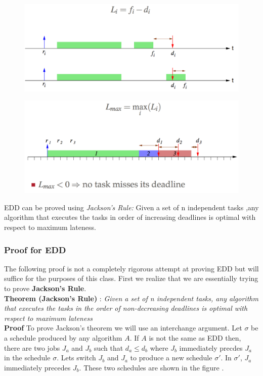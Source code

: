 \documentclass{hw}
\begin{document}
\begin{figure}[H]
  \centering
  \includegraphics[scale=.6]{img/edd}
\end{figure}
\begin{figure}[H]
  \centering
  \includegraphics[scale=.6]{img/edd2}
\end{figure}
EDD can be proved using \emph{Jackson's Rule:} Given a set of n independent tasks
,any algorithm that executes the tasks in order of increasing deadlines is optimal
with respect to maximum lateness.

\subsubsection{Proof for EDD}
The following proof is not a completely rigorous attempt at proving EDD but
will suffice for the purposes of this class. First we realize that we are
essentially trying to prove \textbf{Jackson's Rule}. \\

\textbf{Theorem (Jackson's Rule)} : \textit{Given a set of n independent tasks,
any algorithm that executes the tasks in the order of non-decreasing deadlines
is optimal with respect to maximum lateness} \\

\textbf{Proof} To prove Jackson's theorem we will use an interchange argument.
Let $\sigma$ be a schedule produced by any algorithm $A$. If $A$ is not the
same as EDD then, there are two jobs $J_a$ and $J_b$ such that $d_a \leq d_b$
where $J_b$ immediately precdes $J_a$ in the schedule $\sigma$. Lets switch
$J_b$ and $J_a$ to produce a new schedule $\sigma '$. In $\sigma '$, $J_a$
immediately precedes $J_b$. These two schedules are shown in the figure
. \\
\end{document}
